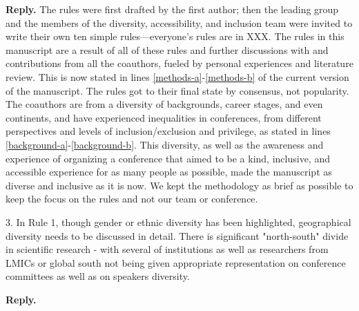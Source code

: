 \documentclass{article}
\newenvironment{Reply}{\noindent\color{BlueViolet}\textbf{Reply.}}{\vspace{1em}}
\begin{document}
\begin{Reply}
    The rules were first drafted by the first author; then the leading group and the members of the diversity, accessibility, and inclusion team were invited to write their own ten simple rules—everyone's rules are in XXX. 
    The rules in this manuscript are a result of all of these rules and further discussions with and contributions from all the coauthors, fueled by personal experiences and literature review.
    This is now stated in lines \ref{methods-a}-\ref{methods-b} of the current version of the manuscript.
    The rules got to their final state by consensus, not popularity. 
    The coauthors are from a diversity of backgrounds, career stages, and even continents, and have experienced inequalities in conferences, from different perspectives and levels of inclusion/exclusion and privilege, as stated in lines \ref{background-a}-\ref{background-b}.
    This diversity, as well as the awareness and experience of organizing a conference that aimed to be a kind, inclusive, and accessible experience for as many people as possible, made the manuscript as diverse and inclusive as it is now. 
    We kept the methodology as brief as possible to keep the focus on the rules and not our team or conference. 
\end{Reply}

3. In Rule 1, though gender or ethnic diversity has been highlighted, geographical diversity needs to be discussed in detail. There is significant "north-south" divide in scientific research - with several of institutions as well as researchers from LMICs or global south not being given appropriate representation on conference committees as well as on speakers diversity.

\begin{Reply}
   
\end{Reply}
\end{document}
